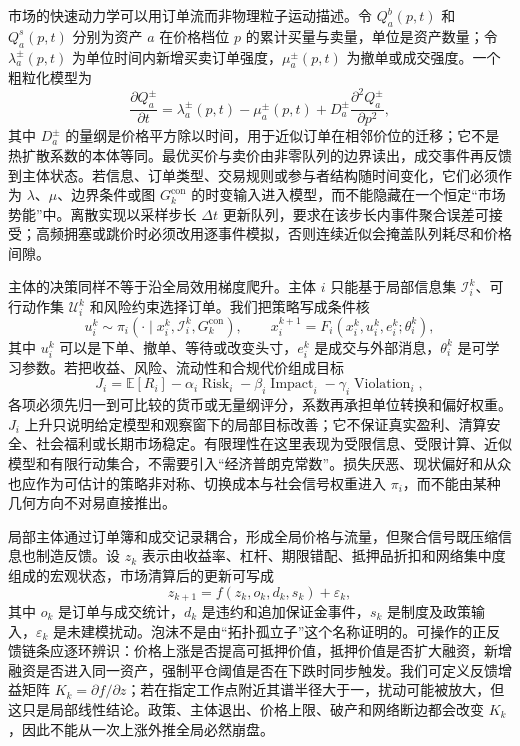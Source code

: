 市场的快速动力学可以用订单流而非物理粒子运动描述。令 $Q_a^{b}(p,t)$ 和 $Q_a^{s}(p,t)$ 分别为资产 $a$ 在价格档位 $p$ 的累计买量与卖量，单位是资产数量；令 $\lambda_a^{\pm}(p,t)$ 为单位时间内新增买卖订单强度，$\mu_a^{\pm}(p,t)$ 为撤单或成交强度。一个粗粒化模型为
\[
\frac{\partial Q_a^{\pm}}{\partial t}
=\lambda_a^{\pm}(p,t)-\mu_a^{\pm}(p,t)
+D_a^{\pm}\frac{\partial^2 Q_a^{\pm}}{\partial p^2},
\]
其中 $D_a^{\pm}$ 的量纲是价格平方除以时间，用于近似订单在相邻价位的迁移；它不是热扩散系数的本体等同。最优买价与卖价由非零队列的边界读出，成交事件再反馈到主体状态。若信息、订单类型、交易规则或参与者结构随时间变化，它们必须作为 $\lambda$、$\mu$、边界条件或图 $G_k^{\mathrm{con}}$ 的时变输入进入模型，而不能隐藏在一个恒定“市场势能”中。离散实现以采样步长 $\Delta t$ 更新队列，要求在该步长内事件聚合误差可接受；高频拥塞或跳价时必须改用逐事件模拟，否则连续近似会掩盖队列耗尽和价格间隙。

主体的决策同样不等于沿全局效用梯度爬升。主体 $i$ 只能基于局部信息集 $\mathcal I_i^k$、可行动作集 $\mathcal U_i^k$ 和风险约束选择订单。我们把策略写成条件核
\[
u_i^k\sim\pi_i(\cdot\mid x_i^k,\mathcal I_i^k,G_k^{\mathrm{con}}),
\qquad
x_i^{k+1}=F_i(x_i^k,u_i^k,e_i^k;\theta_i^k),
\]
\label{eq:economic_tde}
其中 $u_i^k$ 可以是下单、撤单、等待或改变头寸，$e_i^k$ 是成交与外部消息，$\theta_i^k$ 是可学习参数。若把收益、风险、流动性和合规代价组成目标
\[
J_i=\mathbb E[R_i]-\alpha_i\operatorname{Risk}_i-\beta_i\operatorname{Impact}_i-\gamma_i\operatorname{Violation}_i,
\]
各项必须先归一到可比较的货币或无量纲评分，系数再承担单位转换和偏好权重。$J_i$ 上升只说明给定模型和观察窗下的局部目标改善；它不保证真实盈利、清算安全、社会福利或长期市场稳定。有限理性在这里表现为受限信息、受限计算、近似模型和有限行动集合，不需要引入“经济普朗克常数”。损失厌恶、现状偏好和从众也应作为可估计的策略非对称、切换成本与社会信号权重进入 $\pi_i$，而不能由某种几何方向不对易直接推出。

\label{subsec:micro_semantion}
局部主体通过订单簿和成交记录耦合，形成全局价格与流量，但聚合信号既压缩信息也制造反馈。设 $z_k$ 表示由收益率、杠杆、期限错配、抵押品折扣和网络集中度组成的宏观状态，市场清算后的更新可写成
\[
z_{k+1}=f(z_k,o_k,d_k,s_k)+\varepsilon_k,
\]
其中 $o_k$ 是订单与成交统计，$d_k$ 是违约和追加保证金事件，$s_k$ 是制度及政策输入，$\varepsilon_k$ 是未建模扰动。泡沫不是由“拓扑孤立子”这个名称证明的。可操作的正反馈链条应逐环辨识：价格上涨是否提高可抵押价值，抵押价值是否扩大融资，新增融资是否进入同一资产，强制平仓阈值是否在下跌时同步触发。我们可定义反馈增益矩阵 $K_k=\partial f/\partial z$；若在指定工作点附近其谱半径大于一，扰动可能被放大，但这只是局部线性结论。政策、主体退出、价格上限、破产和网络断边都会改变 $K_k$，因此不能从一次上涨外推全局必然崩盘。

